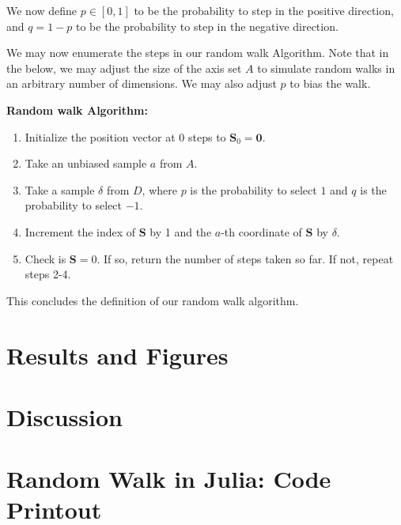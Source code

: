 \documentclass{article}
\begin{document}
We now define $p \in [0,1]$ to be the probability to step in the positive direction, and $q = 1-p$ to be the probability to step in the negative direction.

We may now enumerate the steps in our random walk Algorithm. Note that in the below, we may adjust the size of the axis set $A$ to simulate random walks in an arbitrary number of dimensions. We may also adjust $p$ to bias the walk.

\textbf{Random walk Algorithm:}
\begin{enumerate}
    \item Initialize the position vector at $0$ steps to  $\mathbf{S}_0 = \mathbf{0}$.
    \item Take an unbiased sample $a$ from $A$.
    \item Take a sample $\delta$ from $D$, where $p$ is the probability to select $1$ and $q$ is the probability to select $-1$.
    \item Increment the index of $\mathbf{S}$ by 1 and the  $a$-th coordinate of $\mathbf{S}$ by $\delta$.
    \item Check is $\mathbf{S} = 0$. If so, return the number of steps taken so far. If not, repeat steps 2-4.
\end{enumerate}

This concludes the definition of our random walk algorithm.

\section{Results and Figures}

\section{Discussion}

\section{Random Walk in Julia: Code Printout}
\end{document}
